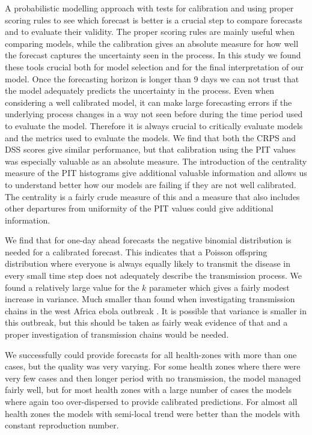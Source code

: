 \documentclass[12pt]{article}
\begin{document}
A probabilistic modelling approach with tests for calibration and using proper scoring rules to see which forecast is better is a crucial step to compare forecasts and to evaluate their validity. The proper scoring rules are mainly useful when comparing models, while the calibration gives an absolute measure for how well the forecast captures the uncertainty seen in the process. In this study we found these tools crucial both for model selection and for the final interpretation of our model. Once the forecasting horizon is longer than 9 days we can not trust that the model adequately predicts the uncertainty in the process. Even when considering a well calibrated model, it can make large forecasting errors if the underlying process changes in a way not seen before during the time period used to evaluate the model. Therefore it is always crucial to critically evaluate models and the metrics used to evaluate the models. We find that both the CRPS and DSS scores give similar performance, but that calibration using the PIT values was especially valuable as an absolute measure. The introduction of the centrality measure of the PIT histograms give additional valuable information and allows us to understand better how our models are failing if they are not well calibrated. The centrality is a fairly crude measure of this and a measure that also includes other departures from uniformity of the PIT values could give additional information. 

We find that for one-day ahead forecasts the negative binomial distribution is needed for a calibrated forecast. This indicates that a Poisson offspring distribution where everyone is always equally likely to transmit the disease in every small time step does not adequately describe the transmission process. We found a relatively large value for the $k$ parameter which gives a fairly modest increase in variance. Much smaller than found when investigating transmission chains in the west Africa ebola outbreak \cite{internationalebolaresponseteamExposurePatternsDriving2016}. It is possible that variance is smaller in this outbreak, but this should be taken as fairly weak evidence of that and a proper investigation of transmission chains would be needed. 

We successfully could provide forecasts for all health-zones with more than one cases, but the quality was very varying. For some health zones where there were very few cases and then longer period with no transmission, the model managed fairly well, but for most health zones with a large number of cases the models where again too over-dispersed to provide calibrated predictions. For almost all health zones the models with semi-local trend were better than the models with constant reproduction number. 
\end{document}
